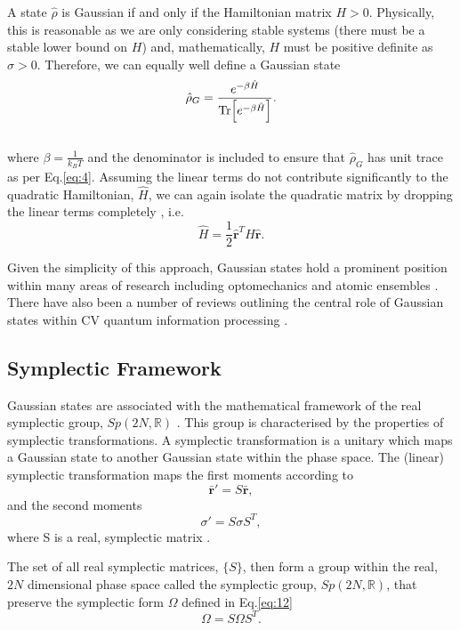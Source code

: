 \documentclass[11pt,a4paper,openbib]{article}
\numberwithin{equation}{section}
\begin{document}
A state $\hat{\rho}$ is Gaussian if and only if the Hamiltonian matrix $ \mathit{H} > 0$. Physically, this is reasonable as we are only considering stable systems (there must be a stable lower bound on $H$) and, mathematically, $H$ must be positive definite as $\sigma>0$. Therefore, we can equally well define a Gaussian state
\begin{equation} \label{eq:21}
\hat{\rho}_G = \frac{e^{-\beta \hat{H}}}{\Tr[e^{-\beta \hat{H}}]}.
\end{equation}\\
where $\beta = \frac{1}{k_BT}$ and the denominator is included to ensure that $\hat{\rho}_G$ has unit trace as per Eq.\ref{eq:4}. Assuming the linear terms do not contribute significantly to the quadratic Hamiltonian, $\hat{H}$, we can again isolate the quadratic matrix by dropping the linear terms completely \cite{Genoni16}, i.e.
\begin{equation} \label{eq:22}
\hat{H} = \frac{1}{2}\mathbf{\hat{r}}^{T}H\mathbf{\hat{r}}.
\end{equation}

Given the simplicity of this approach, Gaussian states hold a prominent position within many areas of research including optomechanics \cite{Genoni15} and atomic ensembles \cite{Sherson}. There have also been a number of reviews outlining the central role of Gaussian states within CV quantum information processing \cite{Napoli05, Weedbrook12}. 

\subsection{Symplectic Framework}
\label{sec:symplectic}
Gaussian states are associated with the mathematical framework of the real symplectic group, $Sp(2N, \mathbb{R})$ \cite{Arvind95}. This group is characterised by the properties of symplectic transformations. A symplectic transformation is a unitary which maps a Gaussian state to another Gaussian state within the phase space. The (linear) symplectic transformation maps the first moments according to
\begin{equation}\label{eq:23}
\mathbf{\bar{r}}' = S \mathbf{\bar{r}},
\end{equation}
and the second moments
\begin{equation}\label{eq:24}
\sigma' = S\sigma S^T,
\end{equation}
where S is a real, symplectic matrix \cite{Adesso14}.

The set of all real symplectic matrices, $\{S\}$, then form a group within the real, $2N$ dimensional phase space called the symplectic group, $Sp(2N, \mathbb{R})$, that preserve the symplectic form $\Omega$ defined in Eq.\ref{eq:12}
\begin{equation} \label{eq:25}
\Omega = S\Omega S^T .
\end{equation}
\end{document}
